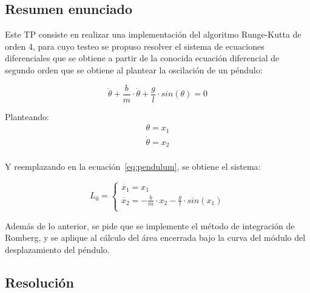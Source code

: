 
\subsection{Resumen enunciado}



\normalfont

Este TP consiste en realizar una implementación del algoritmo Runge-Kutta de orden 4, para cuyo testeo se propuso resolver el sistema de ecuaciones diferenciales que se obtiene a partir de la conocida ecuación diferencial de segundo orden que se obtiene al plantear la oscilación de un péndulo:


\begin{equation}
\ddot{\theta} + \frac{b}{m} \cdot \dot{\theta} + \frac{g}{l} \cdot sin \left( \theta \right) = 0
\label{eq:pendulum}
\end{equation}


Planteando:
\begin{equation*}
                \begin{array}{ll}
                  \theta = x_{1} \\
                  \dot{\theta} = x_{2} \\                
                \end{array}
\end{equation*}

Y reemplazando en la ecuación~\eqref{eq:pendulum}, se obtiene el sistema:

\begin{equation}
     L_{0}=\left\{
                \begin{array}{ll}
                  \dot{x_{1}} = x_{1} \\
                  \dot{x_{2}} = - \frac{b}{m} \cdot x_{2} - \frac{g}{l} \cdot sin \left( x_{1} \right) \\
                \end{array}
              \right. 
\end{equation}

Además de lo anterior, se pide que se implemente el método de integración de Romberg, y se aplique al cálculo del área encerrada bajo la curva del módulo del desplazamiento del péndulo.


\subsection{Resolución}

